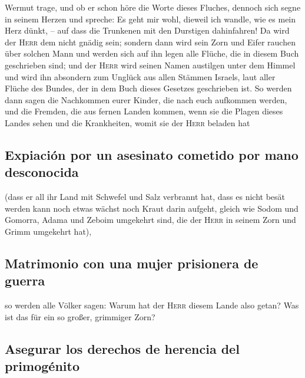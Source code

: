 Wermut trage,  und ob er schon höre die Worte dieses
Fluches, dennoch sich segne in seinem Herzen und spreche: Es geht mir
wohl, dieweil ich wandle, wie es mein Herz dünkt, -- auf dass die
Trunkenen mit den Durstigen dahinfahren!  Da wird der
\textsc{Herr} dem nicht gnädig sein; sondern dann wird sein Zorn und
Eifer rauchen über solchen Mann und werden sich auf ihn legen alle
Flüche, die in diesem Buch geschrieben sind; und der \textsc{Herr} wird
seinen Namen austilgen unter dem Himmel  und wird ihn
absondern zum Unglück aus allen Stämmen Israels, laut aller Flüche des
Bundes, der in dem Buch dieses Gesetzes geschrieben ist. 
So werden dann sagen die Nachkommen eurer Kinder, die nach euch
aufkommen werden, und die Fremden, die aus fernen Landen kommen, wenn
sie die Plagen dieses Landes sehen und die Krankheiten, womit sie der
\textsc{Herr} beladen hat

\hypertarget{expiaciuxf3n-por-un-asesinato-cometido-por-mano-desconocida}{%
\subsection{Expiación por un asesinato cometido por mano
desconocida}\label{expiaciuxf3n-por-un-asesinato-cometido-por-mano-desconocida}}

 (dass er all ihr Land mit Schwefel und Salz verbrannt
hat, dass es nicht besät werden kann noch etwas wächst noch Kraut darin
aufgeht, gleich wie Sodom und Gomorra, Adama und Zeboim umgekehrt sind,
die der \textsc{Herr} in seinem Zorn und Grimm umgekehrt hat),

\hypertarget{matrimonio-con-una-mujer-prisionera-de-guerra}{%
\subsection{Matrimonio con una mujer prisionera de
guerra}\label{matrimonio-con-una-mujer-prisionera-de-guerra}}

 so werden alle Völker sagen: Warum hat der \textsc{Herr}
diesem Lande also getan? Was ist das für ein so großer, grimmiger Zorn?

\hypertarget{asegurar-los-derechos-de-herencia-del-primoguxe9nito}{%
\subsection{Asegurar los derechos de herencia del
primogénito}\label{asegurar-los-derechos-de-herencia-del-primoguxe9nito}}

